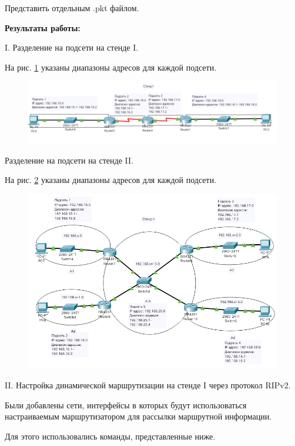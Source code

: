 \documentclass[a4paper,14pt]{extreport} %
\begin{document}
Представить отдельным .pkt файлом. 

\textbf{Результаты работы:}

I. Разделение на подсети на стенде I.

На рис. \ref{fig:podseti1} указаны диапазоны адресов для каждой подсети.

\begin{figure}[H]
	\centering
	\includegraphics[width=1\linewidth]{podseti1}
	\caption{}
	\label{fig:podseti1}
\end{figure}


Разделение на подсети на стенде II.

На рис. \ref{fig:podseti2} указаны диапазоны адресов для каждой подсети.

\begin{figure}[H]
	\centering
	\includegraphics[width=1\linewidth]{podseti2}
	\caption{}
	\label{fig:podseti2}
\end{figure}

II. Настройка динамической маршрутизации на
стенде I через протокол RIPv2. 

Были добавлены сети, интерфейсы в которых будут использоваться настраиваемым маршрутизатором для рассылки маршрутной информации.

Для этого использовались команды, представленные ниже.
\end{document}

